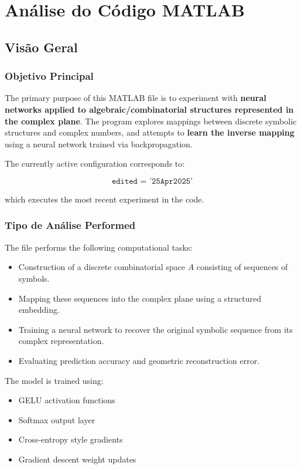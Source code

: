 
\chapter{Análise do Código MATLAB}
\author{Expert Software Engineer}
\section{Visão Geral}

\subsection{Objetivo Principal}

The primary purpose of this MATLAB file is to experiment with \textbf{neural networks applied to algebraic/combinatorial structures represented in the complex plane}. The program explores mappings between discrete symbolic structures and complex numbers, and attempts to \textbf{learn the inverse mapping} using a neural network trained via backpropagation.

The currently active configuration corresponds to:

\[
\texttt{edited = '25Apr2025'}
\]

which executes the most recent experiment in the code.

\subsection{Tipo de Análise Performed}

The file performs the following computational tasks:

\begin{itemize}
\item Construction of a discrete combinatorial space \(A\) consisting of sequences of symbols.
\item Mapping these sequences into the complex plane using a structured embedding.
\item Training a neural network to recover the original symbolic sequence from its complex representation.
\item Evaluating prediction accuracy and geometric reconstruction error.
\end{itemize}

The model is trained using:

\begin{itemize}
\item GELU activation functions
\item Softmax output layer
\item Cross-entropy style gradients
\item Gradient descent weight updates
\end{itemize}

